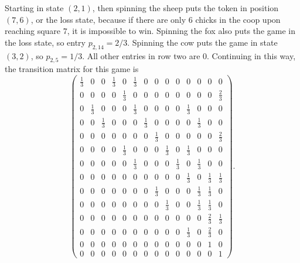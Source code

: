 \documentclass[12pt]{article}
\begin{document}
\begin{example}
    Starting in state \( (2, 1) \), then spinning the sheep puts the
    token in position \( (7, 6) \), or the loss state, because if there
    are only \( 6 \) chicks in the coop upon reaching square \( 7 \), it
    is impossible to win.  Spinning the fox also puts the game in the
    loss state, so entry \( p_{2,14} = 2/3 \).  Spinning the cow puts
    the game in state \( (3, 2) \), so \( p_{2,5} = 1/3 \).  All other
    entries in row two are \( 0 \).  Continuing in this way, the
    transition matrix for this game is
    \[
        \begin{pmatrix}
            \frac{1}{3} & 0     & 0     & \frac{1}{3}   & 0     & \frac{1}
            {3} & 0     & 0     & 0     & 0     & 0     & 0     & 0
            & 0\\
            0   & 0     & 0     & 0     & \frac{1}{3}   & 0     & 0
            & 0 & 0     & 0     & 0     & 0     & 0     & \frac{2}{3}\\
            0   & \frac{1}{3}   & 0     & 0     & 0     & \frac{1}{3}
            & 0 & 0     & 0     & 0     & \frac{1}{3}   & 0     & 0
            & 0\\
            0   & 0     & \frac{1}{3}   & 0     & 0     & 0     & \frac{1}
            {3} & 0     & 0     & 0     & 0     & \frac{1}{3}   & 0
            & 0\\
            0   & 0     & 0     & 0     & 0     & 0     & 0     & \frac{1}
            {3} & 0     & 0     & 0     & 0     & 0     & \frac{2}{3}\\
            0   & 0     & 0     & 0     & \frac{1}{3}   & 0     & 0
            & 0 & \frac{1}{3}   & 0     & \frac{1}{3}   & 0     & 0
            & 0\\
            0   & 0     & 0     & 0     & 0     & \frac{1}{3}   & 0
            & 0 & 0     & \frac{1}{3}   & 0     & \frac{1}{3}   & 0
            & 0\\
            0   & 0     & 0     & 0     & 0     & 0     & 0     & 0
            & 0 & 0     & \frac{1}{3}   & 0     & \frac{1}{3}   & \frac{1}
            {3}\\
            0   & 0     & 0     & 0     & 0     & 0     & 0     & \frac{1}
            {3} & 0     & 0     & 0     & \frac{1}{3}   & \frac{1}{3}
            & 0\\
            0   & 0     & 0     & 0     & 0     & 0     & 0     & 0
            & \frac{1}{3}       & 0     & 0     & \frac{1}{3}   & \frac{1}
            {3} & 0\\
            0   & 0     & 0     & 0     & 0     & 0     & 0     & 0
            & 0 & 0     & 0     & 0     & \frac{2}{3}   & \frac{1}{3}\\
            0   & 0     & 0     & 0     & 0     & 0     & 0     & 0
            & 0 & 0     & \frac{1}{3}   & 0     & \frac{2}{3}   & 0\\
            0   & 0     & 0     & 0     & 0     & 0     & 0     & 0
            & 0 & 0     & 0     & 0     & 1     & 0\\
            0   & 0     & 0     & 0     & 0     & 0     & 0     & 0
            & 0 & 0     & 0     & 0     & 0     & 1
        \end{pmatrix}
        .
    \]


\end{example}
\end{document}
